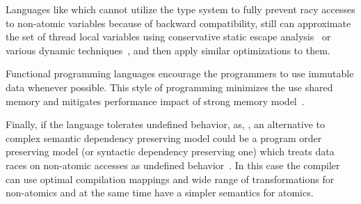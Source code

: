 Languages like \Java which cannot utilize the type system 
to fully prevent racy accesses to non-atomic variables 
because of backward compatibility, still can 
approximate the set of thread local variables    
using conservative static escape analysis~\cite{Choi-al:OOPSLA1999}
or various dynamic techniques~\cite{Liu-al:PLDI19},
and then apply similar optimizations to them. 

Functional programming languages encourage 
the programmers to use immutable data whenever possible.
This style of programming minimizes the use 
shared memory and mitigates performance impact 
of strong memory model~\cite{Vollmer-al:PPoPP17}. 

Finally, if the language tolerates undefined behavior, as, \CPP, 
an alternative to complex semantic dependency preserving model
could be a program order preserving model (or syntactic dependency preserving one) 
which treats data races on non-atomic accesses as 
undefined behavior~\cite{Boehm-Demsky:MSPC14, Ou-Demsky:OOPSLA18}.
In this case the compiler can use optimal compilation mappings 
and wide range of transformations for non-atomics 
and at the same time have a simpler semantics for atomics. 
